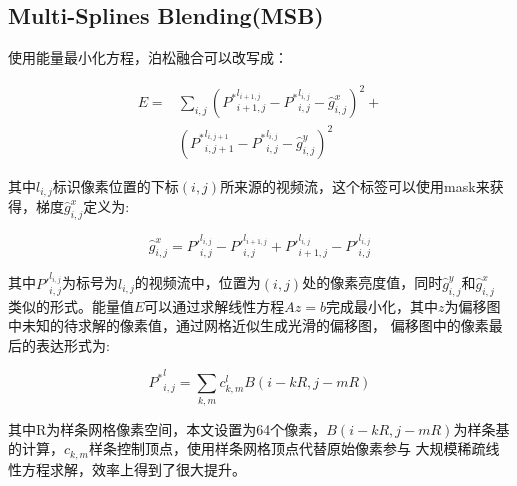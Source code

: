 \subsection{Multi-Splines Blending(MSB)}
使用能量最小化方程，泊松融合可以改写成：
\begin{center}
    \begin{equation}\label{msbe}
    \begin{split}
       E= & \underset{i,j}{\sum}({P^*}_{i+1,j}^{l_{i+1,j}}-{P^*}_{i,j}^{l_{i,j}}-\hat{g}_{i,j}^x)^2+ \\
         & ({P^*}_{i,j+1}^{l_{i,j+1}}-{P^*}_{i,j}^{l_{i,j}}-\hat{g}_{i,j}^y)^2
    \end{split}
    \end{equation}
\end{center}
其中$l_{i,j}$标识像素位置的下标$(i,j)$所来源的视频流，这个标签可以使用mask来获得，梯度$\hat{g}_{i,j}^x$定义为:
   \begin{center}
    \begin{equation}\label{int}
        \hat{g}_{i,j}^x={P'}_{i,j}^{l_{i,j}}-{P'}_{i,j}^{l_{i+1,j}}+{P'}_{i+1,j}^{l_{i,j}}-{P'}_{i,j}^{l_{i,j}}
    \end{equation}
\end{center}
其中${P'}_{i,j}^{l_{i,j}}$为标号为$l_{i,j}$的视频流中，位置为$(i,j)$处的像素亮度值，同时$\hat{g}_{i,j}^y$和$\hat{g}_{i,j}^x$
类似的形式。能量值$E$可以通过求解线性方程$Az=b$完成最小化，其中$z$为偏移图中未知的待求解的像素值，通过网格近似生成光滑的偏移图，
偏移图中的像素最后的表达形式为:
\begin{center}
    \begin{equation}\label{ms}
       {P^*}_{i,j}^l=\underset{k,m}{\sum}c_{k,m}^lB(i-kR,j-mR)
    \end{equation}
\end{center}
其中R为样条网格像素空间，本文设置为64个像素，$B(i-kR,j-mR)$为样条基的计算，$c_{k,m}$样条控制顶点，使用样条网格顶点代替原始像素参与
大规模稀疏线性方程求解，效率上得到了很大提升。

